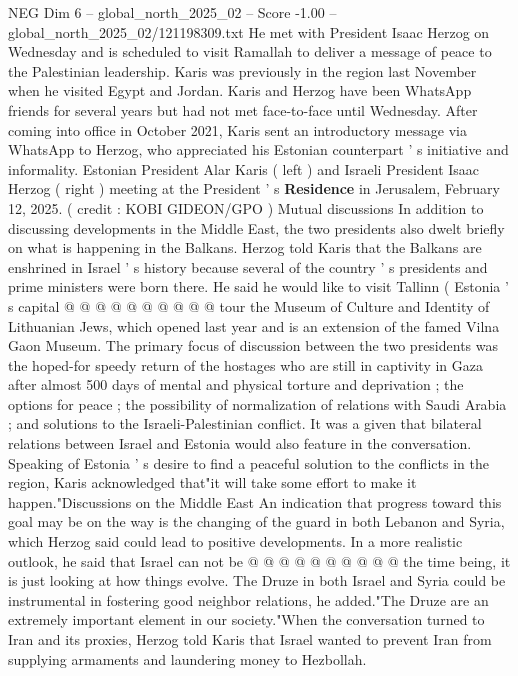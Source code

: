 \begin{textsample}{NEG Dim 6 – global\_north\_2025\_02 – Score -1.00 – global\_north\_2025\_02/121198309.txt}  \label{ex:f6_neg_110}
He met with President Isaac Herzog on Wednesday and is scheduled to visit Ramallah to deliver a message of peace to the Palestinian leadership.
Karis was previously in the region last November when he visited Egypt and Jordan.
Karis and Herzog have been WhatsApp friends for several years but had not met face-to-face until Wednesday.
After coming into office in October 2021, Karis sent an introductory message via WhatsApp to Herzog, who appreciated his Estonian counterpart ' s initiative and informality.
Estonian President Alar Karis ( left ) and Israeli President Isaac Herzog ( right ) meeting at the President ' s \textbf{Residence} in Jerusalem, February 12, 2025. ( credit : KOBI GIDEON/GPO ) Mutual discussions In addition to discussing developments in the Middle East, the two presidents also dwelt briefly on what is happening in the Balkans.
Herzog told Karis that the Balkans are enshrined in Israel ' s history because several of the country ' s presidents and prime ministers were born there.
He said he would like to visit Tallinn ( Estonia ' s capital @ @ @ @ @ @ @ @ @ @ tour the Museum of Culture and Identity of Lithuanian Jews, which opened last year and is an extension of the famed Vilna Gaon Museum.
The primary focus of discussion between the two presidents was the hoped-for speedy return of the hostages who are still in captivity in Gaza after almost 500 days of mental and physical torture and deprivation ; the options for peace ; the possibility of normalization of relations with Saudi Arabia ; and solutions to the Israeli-Palestinian conflict.
It was a given that bilateral relations between Israel and Estonia would also feature in the conversation.
Speaking of Estonia ' s desire to find a peaceful solution to the conflicts in the region, Karis acknowledged that"it will take some effort to make it happen."Discussions on the Middle East An indication that progress toward this goal may be on the way is the changing of the guard in both Lebanon and Syria, which Herzog said could lead to positive developments.
In a more realistic outlook, he said that Israel can not be @ @ @ @ @ @ @ @ @ @ the time being, it is just looking at how things evolve.
The Druze in both Israel and Syria could be instrumental in fostering good neighbor relations, he added."The Druze are an extremely important element in our society."When the conversation turned to Iran and its proxies, Herzog told Karis that Israel wanted to prevent Iran from supplying armaments and laundering money to Hezbollah.

\end{textsample}
